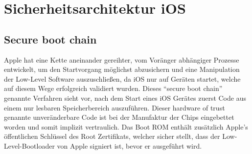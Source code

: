 \section{Sicherheitsarchitektur iOS}
	\subsection{Secure boot chain}
	Apple hat eine Kette aneinander gereihter, vom Voränger abhängiger Prozesse
	entwickelt, um den Startvorgang möglichst abzusichern und eine Manipulation
	der Low-Level Software auszuschließen, da iOS nur auf Geräten startet, welche
	auf diesem Wege erfolgreich validiert wurden. Dieses "`secure boot chain"'
	genannte Verfahren sieht vor, nach dem Start eines iOS Gerätes zuerst
	Code aus einem nur lesbaren Speicherbereich auszuführen. Dieser hardware of
	trust genannte unveränderbare Code ist bei der Manufaktur der Chips eingebettet 
	worden und somit implizit vertraulich. Das Boot ROM enthält zusätzlich Apple's 
	öffentlichen Schlüssel des Root Zertifikats, welcher sicher stellt, dass der 
	Low-Level-Bootloader von Apple signiert ist, bevor er ausgeführt wird. 
	
    
